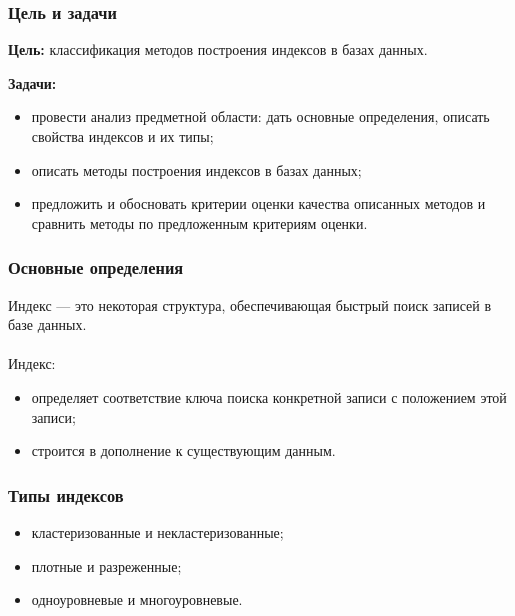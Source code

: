 \documentclass{bmstu-pr}
\begin{document}

\begin{frame}
    \frametitle{Цель и задачи}

    \textbf{Цель:} классификация методов построения индексов в
    базах данных.

    \textbf{Задачи:}
    \begin{itemize}
        \item провести анализ предметной области: дать основные определения,
            описать свойства индексов и их типы;
        \item описать методы построения индексов в базах данных;
        \item предложить и обосновать критерии оценки качества описанных методов
          и сравнить методы по предложенным критериям оценки.
    \end{itemize}
\end{frame}

\begin{frame}
    \frametitle{Основные определения}

    Индекс --- это некоторая структура, обеспечивающая быстрый поиск записей в
    базе данных.
    ~\\
    ~\\
    Индекс:
    \begin{itemize}
        \item определяет соответствие ключа поиска конкретной записи с
            положением этой записи;
        \item строится в дополнение к существующим данным.
    \end{itemize}
\end{frame}

\begin{frame}
    \frametitle{Типы индексов}

    \begin{itemize}
        \item кластеризованные и некластеризованные;
        \item плотные и разреженные;
        \item одноуровневые и многоуровневые.
    \end{itemize}

    \hspace*{\fill}%
    \hfill
    \hfill
    \hspace*{\fill}

\end{frame}
\end{document}
